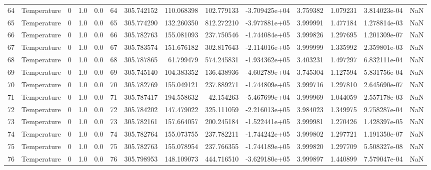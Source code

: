 \begin{tabular}{llrrrrrrrrrrrr}
64  &  Temperature &       0 &  1.0 &  0.0 &   64 &  305.742152 &   110.068398 &     102.779133 & -3.709425e+04 &  3.759382 &  1.079231 &  3.814023e-04 &      NaN \\
65  &  Temperature &       0 &  1.0 &  0.0 &   65 &  305.774290 &   132.260350 &     812.272210 & -3.977881e+05 &  3.999991 &  1.477184 &  1.278814e-03 &      NaN \\
66  &  Temperature &       0 &  1.0 &  0.0 &   66 &  305.782763 &   155.081093 &     237.750546 & -1.744084e+05 &  3.999826 &  1.297695 &  1.201309e-07 &      NaN \\
67  &  Temperature &       0 &  1.0 &  0.0 &   67 &  305.783574 &   151.676182 &     302.817643 & -2.114016e+05 &  3.999999 &  1.335992 &  2.359801e-03 &      NaN \\
68  &  Temperature &       0 &  1.0 &  0.0 &   68 &  305.787865 &    61.799479 &     574.245831 & -1.934362e+05 &  3.403231 &  1.497297 &  6.832111e-04 &      NaN \\
69  &  Temperature &       0 &  1.0 &  0.0 &   69 &  305.745140 &   104.383352 &     136.438936 & -4.602789e+04 &  3.745304 &  1.127594 &  5.831756e-04 &      NaN \\
70  &  Temperature &       0 &  1.0 &  0.0 &   70 &  305.782769 &   155.049121 &     237.889271 & -1.744809e+05 &  3.999716 &  1.297810 &  2.645690e-07 &      NaN \\
71  &  Temperature &       0 &  1.0 &  0.0 &   71 &  305.787417 &   194.558632 &      42.154263 & -5.467699e+04 &  3.999969 &  1.044059 &  2.557178e-03 &      NaN \\
72  &  Temperature &       0 &  1.0 &  0.0 &   72 &  305.784202 &   147.479022 &     325.111059 & -2.216013e+05 &  3.984023 &  1.349975 &  9.758287e-04 &      NaN \\
73  &  Temperature &       0 &  1.0 &  0.0 &   73 &  305.782161 &   157.664057 &     200.245184 & -1.522441e+05 &  3.999981 &  1.270426 &  1.428397e-05 &      NaN \\
74  &  Temperature &       0 &  1.0 &  0.0 &   74 &  305.782764 &   155.073755 &     237.782211 & -1.744242e+05 &  3.999802 &  1.297721 &  1.191350e-07 &      NaN \\
75  &  Temperature &       0 &  1.0 &  0.0 &   75 &  305.782763 &   155.078954 &     237.766355 & -1.744189e+05 &  3.999820 &  1.297709 &  5.508327e-08 &      NaN \\
76  &  Temperature &       0 &  1.0 &  0.0 &   76 &  305.798953 &   148.109073 &     444.716510 & -3.629180e+05 &  3.999897 &  1.440899 &  7.579047e-04 &      NaN \\

\end{tabular}

